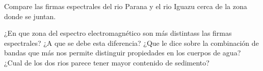 Compare las firmas espectrales del rio Parana y el rio Iguazu cerca de la zona donde se juntan.

\begin{que}
    ¿En que zona del espectro electromagnético son más distintass las firmas espectrales? ¿A que se debe esta diferencia? ¿Que le dice sobre la combinación de bandas que más nos permite distinguir propiedades en los cuerpos de agua? ¿Cual de los dos rios parece tener mayor contenido de sedimento?
\end{que}
